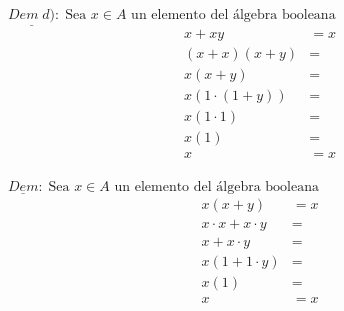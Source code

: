 \begin{multicols}{2}
	\noindent
	$\underline{Dem \;d)}:\; \text{Sea $x\in A$ un elemento del álgebra booleana}$
	\begin{align*}
		x+xy            & =x \\
		(x+x)(x+y)      & =  \\
		x(x+y)          & =  \\
		x(1\cdot (1+y)) & =  \\
		x(1\cdot 1)     & =  \\
		x(1)            & =  \\
		x               & =x \\
	\end{align*}

	\columnbreak
	\noindent
	$\underline{Dem}:\; \text{Sea $x\in A$ un elemento del álgebra booleana}$
	\begin{align*}
		x(x+y)             & =x  \\
		x\cdot x +x\cdot y & =   \\
		x +x\cdot y        & =   \\
		x (1 + 1\cdot y)   & =   \\
		x (1)              & =   \\
		x                  & = x
	\end{align*}
\end{multicols}

